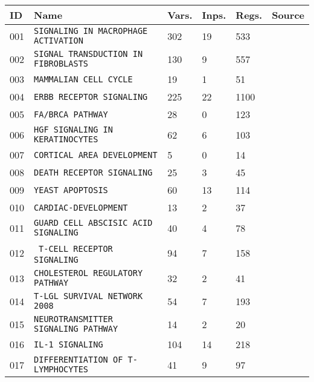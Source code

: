 \documentclass{article}
\begin{document}
\begin{center}
	\begin{tabular}{ | C{16pt} | C{149pt} | C{25pt} | C{25pt} | C{25pt} | C{30pt} | }
		\hline
		ID & Name & Vars. & Inps. & Regs. & Source \\  & \texttt{SIGNALING IN MACROPHAGE ACTIVATION} & 302 & 19 & 533 & \cite{bbm-001, cell-collective} \\  & \texttt{SIGNAL TRANSDUCTION IN FIBROBLASTS} & 130 & 9 & 557 & \cite{bbm-002, cell-collective} \\  & \texttt{MAMMALIAN CELL CYCLE} & 19 & 1 & 51 & \cite{bbm-003, cell-collective} \\  & \texttt{ERBB RECEPTOR SIGNALING} & 225 & 22 & 1100 & \cite{bbm-004, cell-collective}  \\  & \texttt{FA/BRCA PATHWAY} & 28 & 0 & 123 & \cite{bbm-005, cell-collective} \\  & \texttt{HGF SIGNALING IN KERATINOCYTES} & 62 & 6 & 103 & \cite{bbm-006, cell-collective} \\  & \texttt{CORTICAL AREA DEVELOPMENT} & 5 & 0 & 14 & \cite{bbm-007, cell-collective} \\  & \texttt{DEATH RECEPTOR SIGNALING} & 25 & 3 & 45 & \cite{bbm-008, cell-collective} \\  & \texttt{YEAST APOPTOSIS} & 60 & 13 & 114 & \cite{bbm-009, cell-collective} \\  & \texttt{CARDIAC-DEVELOPMENT} & 13 & 2 & 37 & \cite{bbm-010, cell-collective} \\  & \texttt{GUARD CELL ABSCISIC ACID SIGNALING} & 40 & 4 & 78 & \cite{bbm-011, cell-collective} \\  & \texttt{T-CELL RECEPTOR SIGNALING} & 94 & 7 & 158 & \cite{bbm-012, cell-collective} \\  & \texttt{CHOLESTEROL REGULATORY PATHWAY} & 32 & 2 & 41 & \cite{bbm-013, cell-collective} \\  & \texttt{T-LGL SURVIVAL NETWORK 2008} & 54 & 7 & 193 & \cite{bbm-014, cell-collective} \\  & \texttt{NEUROTRANSMITTER SIGNALING PATHWAY} & 14 & 2 & 20 & \cite{bbm-015, cell-collective} \\  & \texttt{IL-1 SIGNALING} & 104 & 14 & 218 & \cite{bbm-016-019, cell-collective} \\  & \texttt{DIFFERENTIATION OF T-LYMPHOCYTES}  & 41 & 9 & 97 & \cite{bbm-017, cell-collective} \\ \hline

\end{tabular}
\end{center}
\end{document}
